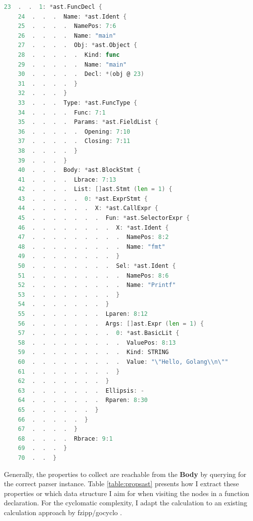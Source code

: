 \documentclass{seal_thesis}
\begin{document}
\begin{lstlisting}[caption=Sample output from yuroyoro's Ast Viewer \cite{goastviewer}., label={yuroyoro}, language=Go, frame=single]
	23  .  .  1: *ast.FuncDecl {
	24  .  .  .  Name: *ast.Ident {
	25  .  .  .  .  NamePos: 7:6
	26  .  .  .  .  Name: "main"
	27  .  .  .  .  Obj: *ast.Object {
	28  .  .  .  .  .  Kind: func
	29  .  .  .  .  .  Name: "main"
	30  .  .  .  .  .  Decl: *(obj @ 23)
	31  .  .  .  .  }
	32  .  .  .  }
	33  .  .  .  Type: *ast.FuncType {
	34  .  .  .  .  Func: 7:1
	35  .  .  .  .  Params: *ast.FieldList {
	36  .  .  .  .  .  Opening: 7:10
	37  .  .  .  .  .  Closing: 7:11
	38  .  .  .  .  }
	39  .  .  .  }
	40  .  .  .  Body: *ast.BlockStmt {
	41  .  .  .  .  Lbrace: 7:13
	42  .  .  .  .  List: []ast.Stmt (len = 1) {
	43  .  .  .  .  .  0: *ast.ExprStmt {
	44  .  .  .  .  .  .  X: *ast.CallExpr {
	45  .  .  .  .  .  .  .  Fun: *ast.SelectorExpr {
	46  .  .  .  .  .  .  .  .  X: *ast.Ident {
	47  .  .  .  .  .  .  .  .  .  NamePos: 8:2
	48  .  .  .  .  .  .  .  .  .  Name: "fmt"
	49  .  .  .  .  .  .  .  .  }
	50  .  .  .  .  .  .  .  .  Sel: *ast.Ident {
	51  .  .  .  .  .  .  .  .  .  NamePos: 8:6
	52  .  .  .  .  .  .  .  .  .  Name: "Printf"
	53  .  .  .  .  .  .  .  .  }
	54  .  .  .  .  .  .  .  }
	55  .  .  .  .  .  .  .  Lparen: 8:12
	56  .  .  .  .  .  .  .  Args: []ast.Expr (len = 1) {
	57  .  .  .  .  .  .  .  .  0: *ast.BasicLit {
	58  .  .  .  .  .  .  .  .  .  ValuePos: 8:13
	59  .  .  .  .  .  .  .  .  .  Kind: STRING
	60  .  .  .  .  .  .  .  .  .  Value: "\"Hello, Golang\\n\""
	61  .  .  .  .  .  .  .  .  }
	62  .  .  .  .  .  .  .  }
	63  .  .  .  .  .  .  .  Ellipsis: -
	64  .  .  .  .  .  .  .  Rparen: 8:30
	65  .  .  .  .  .  .  }
	66  .  .  .  .  .  }
	67  .  .  .  .  }
	68  .  .  .  .  Rbrace: 9:1
	69  .  .  .  }
	70  .  .  }
\end{lstlisting}


\noindent Generally, the properties to collect are reachable from the \textbf{Body} by querying for the correct parser instance. Table \ref{table:propsast} presents how I extract these properties or which data structure I aim for when visiting the nodes in a function declaration. For the cyclomatic complexity, I adapt the calculation to an existing calculation approach by fzipp/gocyclo \cite{gocyclo}. 
\end{document}
